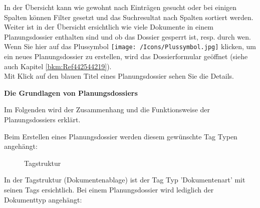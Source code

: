 In der Übersicht kann wie gewohnt nach Einträgen gesucht oder bei einigen Spalten können Filter gesetzt und das Suchresultat nach Spalten sortiert werden. Weiter ist in der Übersicht ersichtlich wie viele Dokumente in einem Planungsdossier enthalten sind und ob das Dossier gesperrt ist, resp. durch wen. Wenn Sie hier auf das Plussymbol \texttt{[image: /Icons/Plussymbol.jpg]} klicken, um ein neues Planungsdossier zu erstellen, wird das Dossierformular geöffnet (siehe auch Kapitel \ref{bkm:Ref442544219}).\\

Mit Klick auf den blauen Titel eines Planungsdossier sehen Sie die Details.

\vspace{\baselineskip}

\textbf{Die Grundlagen von Planungsdossiers}

Im Folgenden wird der Zusammenhang und die Funktionsweise der Planungsdossiers erklärt.

\vspace{\baselineskip}

Beim Erstellen eines Planungsdossier werden diesem gewünschte Tag Typen angehängt:

\begin{figure}[H]
\caption{Tagstruktur}
\end{figure}

 In der Tagstruktur (Dokumentenablage) ist der Tag Typ 'Dokumentenart' mit seinen Tags ersichtlich. Bei einem Planungsdossier wird lediglich der Dokumenttyp angehängt:

\pagebreak

